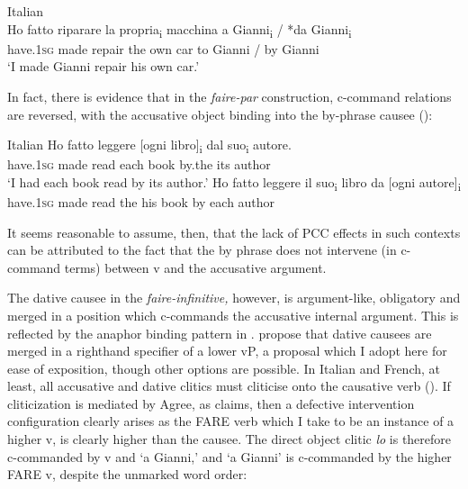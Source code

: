 \documentclass[output=paper,colorlinks,citecolor=brown,nonflat]{./langscibook}
\begin{document}
\ea%
    \label{ex:sheehan:20}
    Italian \citep{Burzio1986}\\
    \gll    Ho   fatto   riparare   la   propria\textsubscript{i} macchina  a  Gianni\textsubscript{i} / *da   Gianni\textsubscript{i}\\
            have.\textsc{1sg}   made   repair   the  own   car   to   Gianni /  by   Gianni\\
    \glt    ‘I made Gianni repair his own car.’ 
\z

In fact, there is evidence that in the \textit{faire-par} construction, c-command relations are reversed, with the accusative object binding into the by-phrase causee (\citealt{SheehanCyrino2016}):

\ea%
    \label{ex:sheehan:21}
    Italian \citep[286]{SheehanCyrino2016}
    \ea\label{ex:sheehan:21a}
    \gll    Ho   fatto   leggere [ogni   libro]\textsubscript{i} dal   suo\textsubscript{i}   autore.\\
            have.\textsc{1sg}   made   read   {\db}each book   by.the   its   author\\
    \glt    ‘I had each book read by its author.’
    \ex\label{ex:sheehan:21b}
    \gll    *Ho   fatto   leggere   il  suo\textsubscript{i} libro   da   [ogni  autore]\textsubscript{i}\\
            have.\textsc{1sg}   made   read   the  his   book   by   {\db}each   author\\
    \z
\z

It seems reasonable to assume, then, that the lack of PCC effects in such contexts can be attributed to the fact that the by phrase does not intervene (in c-command terms) between v and the accusative argument. 

The dative causee in the \textit{faire-infinitive,} however, is argument-like, obligatory and merged in a position which c-commands the accusative internal argument. This is reflected by the anaphor binding pattern in . \citet{FolliHarley2007} propose that dative causees are merged in a righthand specifier of a lower vP, a proposal which I adopt here for ease of exposition, though other options are possible. In Italian and French, at least, all accusative and dative clitics must cliticise onto the causative verb (\citealt{Kayne1975, Burzio1986, Guasti1993}). If cliticization is mediated by Agree, as \citet{Preminger2019} claims, then a defective intervention configuration clearly arises as the FARE verb which I take to be an instance of a higher v, is clearly higher than the causee. The direct object clitic \textit{lo} is therefore c-commanded by v and ‘a Gianni,’ and ‘a Gianni’ is c-commanded by the higher FARE v, despite the unmarked word order:
\end{document}
